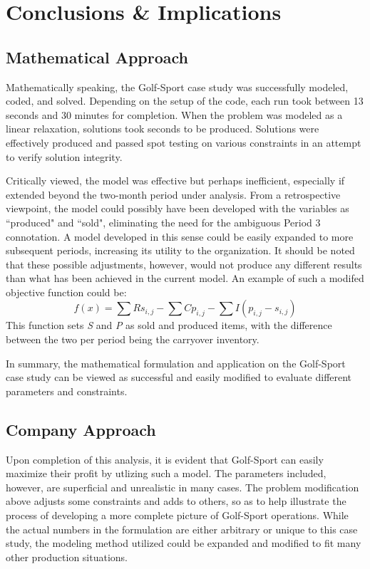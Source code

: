 \documentclass{article}
\begin{document}
\section{Conclusions \& Implications}
\subsection{Mathematical Approach}
Mathematically speaking, the Golf-Sport case study was successfully modeled, coded, and solved.  Depending on the setup of the code, each run took between 13 seconds and 30 minutes for completion.  When the problem was modeled as a linear relaxation, solutions took seconds to be produced.  Solutions were effectively produced and passed spot testing on various constraints in an attempt to verify solution integrity.
\par
Critically viewed, the model was effective but perhaps inefficient, especially if extended beyond the two-month period under analysis.  From a retrospective viewpoint, the model could possibly have been developed with the variables as ``produced" and ``sold", eliminating the need for the ambiguous Period 3 connotation.  A model developed in this sense could be easily expanded to more subsequent periods, increasing its utility to the organization.  It should be noted that these possible adjustments, however, would not produce any different results than what has been achieved in the current model.  An example of such a modifed objective function could be:
$$ f(x) = \sum Rs_{i,j} - \sum Cp_{i,j} - \sum I(p_{i,j}-s_{i,j}) $$
This function sets \textit{S} and \textit{P} as sold and produced items, with the difference between the two per period being the carryover inventory.
\par
In summary, the mathematical formulation and application on the Golf-Sport case study can be viewed as successful and easily modified to evaluate different parameters and constraints.
\subsection{Company Approach}
Upon completion of this analysis, it is evident that Golf-Sport can easily maximize their profit by utlizing such a model.  The parameters included, however, are superficial and unrealistic in many cases.  The problem modification above adjusts some constraints and adds to others, so as to help illustrate the process of developing a more complete picture of Golf-Sport operations.  While the actual numbers in the formulation are either arbitrary or unique to this case study, the modeling method utilized could be expanded and modified to fit many other production situations.
\end{document}
